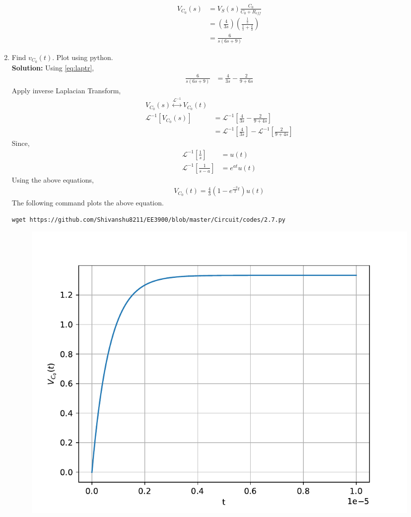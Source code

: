 \documentclass[journal,12pt,twocolumn]{IEEEtran}
\newcommand{\solution}{\noindent \textbf{Solution: }}
\providecommand{\brak}[1]{\ensuremath{\left(#1\right)}}
\providecommand{\system}[1]{\overset{\mathcal{#1}}{ \longleftrightarrow}}
\providecommand{\laplaceinv}[1]{{\mathcal{L}^{-1}\ensuremath{\left[#1\right]}}}
\numberwithin{equation}{section}
\renewcommand\thesection{\arabic{section}}
\begin{document}
\begin{enumerate}[label=\arabic*.,ref=\thesection.\theenumi]
\begin{align}
V_{C_0}(s)&=V_{S}(s)\frac{C_{0}}{C_{0}+R_{eff}}\\
&=\brak{\frac{4}{3s}}\brak{\frac{\frac{1}{s}}{\frac{1}{s}+\frac23}}\\
\label{eq:laptr}
&=\frac{6}{s\brak{6s+9}}
\end{align}
	\item Find $v_{C_0}(t)$.  Plot using python.\\
	\solution Using \eqref{eq:laptr},
	\begin{align}
	\frac{6}{s\brak{6s+9}}&=\frac{4}{3s}-\frac{2}{9+6s}
	\end{align}
	Apply inverse Laplacian Transform,
	\begin{align}
	V_{C_0}(s)\system{L^{-1}}V_{C_0}(t)\\
	\laplaceinv{V_{C_0}(s)}&=\laplaceinv{\frac{4}{3s}-\frac{2}{9+4s}}\\
&=	\laplaceinv{\frac{4}{3s}}-\laplaceinv{\frac{2}{9+4s}}
\end{align}
Since,
\begin{align}
\laplaceinv{\frac1s}&=u(t)\\
\laplaceinv{\frac{1}{s-a}}&=e^{at}u(t)
\end{align}
Using the above equations,
\begin{align}
V_{C_0}(t)=\frac{4}{3}\brak{ 1-e^{\frac{-3}{2} t}}u(t)
	\end{align}
	The following command plots the above equation.
	\begin{lstlisting}
wget https://github.com/Shivanshu8211/EE3900/blob/master/Circuit/codes/2.7.py	
\end{lstlisting}
	\begin{figure}[!ht]
			\centering
			\includegraphics[width=\columnwidth]{figs/2.7}

\end{figure}
\end{enumerate}
\end{document}
